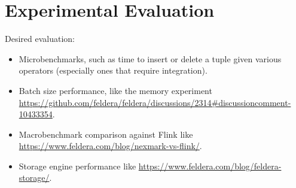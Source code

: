 \section{Experimental Evaluation}\label{sec:experiments}

Desired evaluation:

\begin{itemize}
\item Microbenchmarks, such as time to insert or delete a tuple given
  various operators (especially ones that require integration).

\item Batch size performance, like the memory experiment
  \url{https://github.com/feldera/feldera/discussions/2314#discussioncomment-10433354}.

\item Macrobenchmark comparison against Flink like
  \url{https://www.feldera.com/blog/nexmark-vs-flink/}.

\item Storage engine performance like
  \url{https://www.feldera.com/blog/feldera-storage/}.
\end{itemize}
